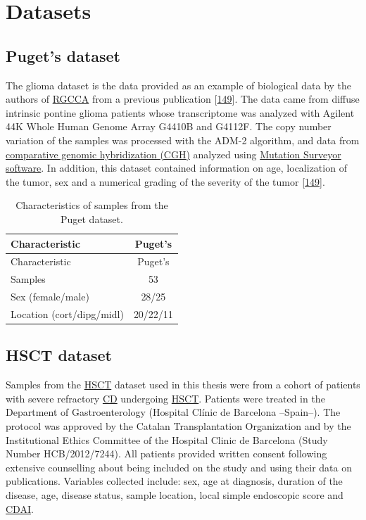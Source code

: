 \documentclass[
  12pt,
  a4paper,
  twoside,
  openright]{book}
\begin{document}
\hypertarget{datasets}{%
\section{Datasets}\label{datasets}}

\hypertarget{methods-puget}{%
\subsection{Puget's dataset}\label{methods-puget}}

The glioma dataset is the data provided as an example of biological data by the authors of \protect\hyperlink{acronyms_RGCCA}{RGCCA} from a previous publication {[}\protect\hyperlink{ref-puget2012}{149}{]}.
The data came from diffuse intrinsic pontine glioma patients whose transcriptome was analyzed with Agilent 44K Whole Human Genome Array G4410B and G4112F.
The copy number variation of the samples was processed with the ADM-2 algorithm, and data from \protect\hyperlink{acronyms_CGH}{comparative genomic hybridization (CGH)} analyzed using \href{https://www.softgenetics.com/mutationSurveyor.php}{Mutation Surveyor software}.
In addition, this dataset contained information on age, localization of the tumor, sex and a numerical grading of the severity of the tumor {[}\protect\hyperlink{ref-puget2012}{149}{]}.

\begin{longtable}[]{@{}lc@{}}
\caption{\label{tab:Puget} Characteristics of samples from the Puget dataset.}\tabularnewline
\toprule
Characteristic & Puget's \\
\midrule
\endfirsthead
\toprule
Characteristic & Puget's \\
\midrule
\endhead
Samples & 53 \\
Sex (female/male) & 28/25 \\
Location (cort/dipg/midl) & 20/22/11 \\
\bottomrule
\end{longtable}

\hypertarget{methods-hsct}{%
\subsection{HSCT dataset}\label{methods-hsct}}

Samples from the \protect\hyperlink{acronyms_HSCT}{HSCT} dataset used in this thesis were from a cohort of patients with severe refractory \protect\hyperlink{acronyms_CD}{CD} undergoing \protect\hyperlink{acronyms_HSCT}{HSCT}.
Patients were treated in the Department of Gastroenterology (Hospital Clínic de Barcelona --Spain--).
The protocol was approved by the Catalan Transplantation Organization and by the Institutional Ethics Committee of the Hospital Clinic de Barcelona (Study Number HCB/2012/7244).
All patients provided written consent following extensive counselling about being included on the study and using their data on publications. Variables collected include: sex, age at diagnosis, duration of the disease, age, disease status, sample location, local simple endoscopic score and \protect\hyperlink{acronyms_CDAI}{CDAI}.
\end{document}
